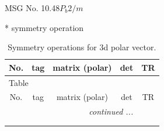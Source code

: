 \documentclass[fleqn,8pt]{jsarticle}
\begin{document}
\setcounter{MaxMatrixCols}{32}

\renewcommand{\tablename}{Table~}
\renewcommand{\figurename}{Figure~}
\begin{center}
\LARGE
MSG No. 10.48\quad$P_{b}2/m$
\end{center}
* symmetry operation
\renewcommand{\arraystretch}{1.3}
\begin{longtable}{ccccc}
\caption{Symmetry operations for 3d polar vector.}
 \\
 \hline \hline
No. & tag & matrix (polar) & det & TR \\ \hline \endfirsthead

\multicolumn{4}{l}{\tablename\ \thetable{}} \\
 \hline \hline
No. & tag & matrix (polar) & det & TR \\ \hline \endhead

 \hline \hline
\multicolumn{4}{r}{\footnotesize\it continued ...} \\ \endfoot

 \hline \hline
\multicolumn{4}{r}{} \\ \endlastfoot


\end{longtable}
\end{document}
